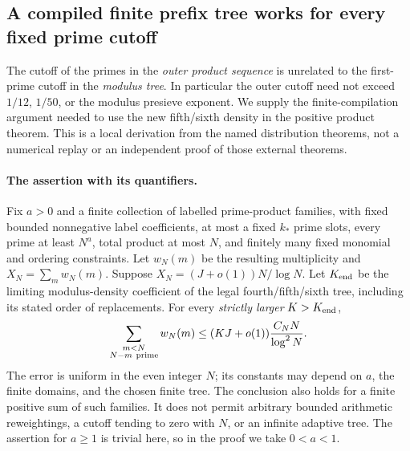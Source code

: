\subsection{A compiled finite prefix tree works for every fixed prime cutoff}
\label{sec:lower-k-uniform-product-interface-review}

The cutoff of the primes in the \emph{outer product sequence} is unrelated
to the first-prime cutoff in the \emph{modulus tree}. In particular the
outer cutoff need not exceed $1/12$, $1/50$, or the modulus presieve
exponent. We supply the finite-compilation argument needed to use the
new fifth/sixth density in the positive product theorem. This is a
local derivation from the named distribution theorems, not a numerical
replay or an independent proof of those external theorems.

\paragraph{The assertion with its quantifiers.}
Fix $a>0$ and a finite collection of labelled prime-product families,
with fixed bounded nonnegative label coefficients, at most a fixed
$k_*$ prime slots, every prime at least $N^a$, total product at most $N$,
and finitely many fixed monomial and ordering constraints. Let $w_N(m)$
be the resulting multiplicity and $X_N=\sum_m w_N(m)$. Suppose
$X_N=(J+o(1))N/\log N$. Let $K_{\rm end}$ be the limiting modulus-density
coefficient of the legal fourth/fifth/sixth tree, including its stated
order of replacements. For every \emph{strictly larger} $K>K_{\rm end}$,
\begin{equation}\label{eq:lower-k-uniform-product-conclusion}
 \sum_{\substack{m<N\\N-m\ {\rm prime}}}w_N(m)
 \le (KJ+o(1))\frac{C_NN}{\log^2N}.
\end{equation}
The error is uniform in the even integer $N$; its constants may depend
on $a$, the finite domains, and the chosen finite tree. The conclusion
also holds for a finite positive sum of such families. It does not
permit arbitrary bounded arithmetic reweightings, a cutoff tending to
zero with $N$, or an infinite adaptive tree. The assertion for $a\ge1$
is trivial here, so in the proof we take $0<a<1$.

